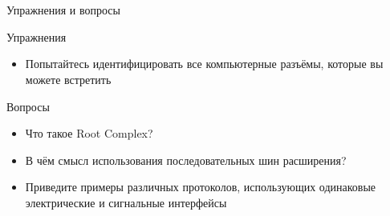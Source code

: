 \documentclass[xetex,aspectratio=43]{beamer}
\begin{document}
\section*{}

\begin{frame}{Упражнения и вопросы}
	\begin{block}{Упражнения}
		\begin{itemize}
			\tightlist
			\item
			Попытайтесь идентифицировать все компьютерные разъёмы, которые вы можете встретить
		\end{itemize}
	\end{block}

	\begin{block}{Вопросы}
		\begin{itemize}
			\tightlist
            \item
            Что такое Root Complex?
            \item
            В чём смысл использования последовательных шин расширения?
            \item
            Приведите примеры различных протоколов, использующих одинаковые электрические и сигнальные интерфейсы
		\end{itemize}
	\end{block}
\end{frame}

\postamble
\end{document}
